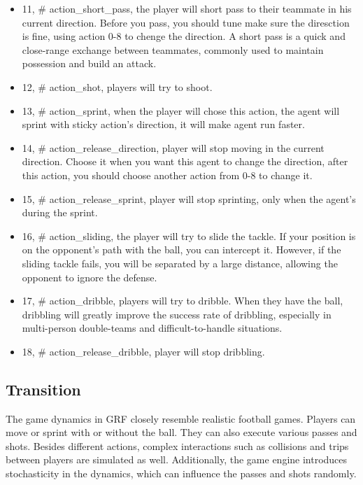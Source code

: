\begin{itemize}
    \item 11, \# action\_short\_pass, the player will short pass to their teammate in his current direction. Before you pass, you should tune make sure the diresction is fine, using action 0-8 to chenge the direction. A short pass is a quick and close-range exchange between teammates, commonly used to maintain possession and build an attack. 
    \item 12, \# action\_shot, players will try to shoot. 
    \item 13, \# action\_sprint, when the player will chose this action, the agent will sprint with sticky action's direction, it will make agent run faster.
    \item 14, \# action\_release\_direction, player will stop moving in the current direction. Choose it when you want this agent to change the direction, after this action, you should choose another action from 0-8 to change it.
    \item 15, \# action\_release\_sprint, player will stop sprinting, only when the agent's during the sprint. 
    \item 16, \# action\_sliding, the player will try to slide the tackle. If your position is on the opponent's path with the ball, you can intercept it. However, if the sliding tackle fails, you will be separated by a large distance, allowing the opponent to ignore the defense.
    \item 17, \# action\_dribble, players will try to dribble. When they have the ball, dribbling will greatly improve the success rate of dribbling, especially in multi-person double-teams and difficult-to-handle situations.
    \item 18, \# action\_release\_dribble, player will stop dribbling.
\end{itemize}



\subsection{Transition}
The game dynamics in GRF closely resemble realistic football games. Players can move or sprint with or without the ball. They can also execute various passes and shots. Besides different actions, complex interactions such as collisions and trips between players are simulated as well. Additionally, the game engine introduces stochasticity in the dynamics, which can influence the passes and shots randomly.




